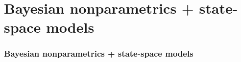 \documentclass[aspectratio=169]{beamer}
\begin{document}
\section{Bayesian nonparametrics + state-space models}
\begin{frame}
    \frametitle{Bayesian nonparametrics + state-space models}



\end{frame}
\end{document}
